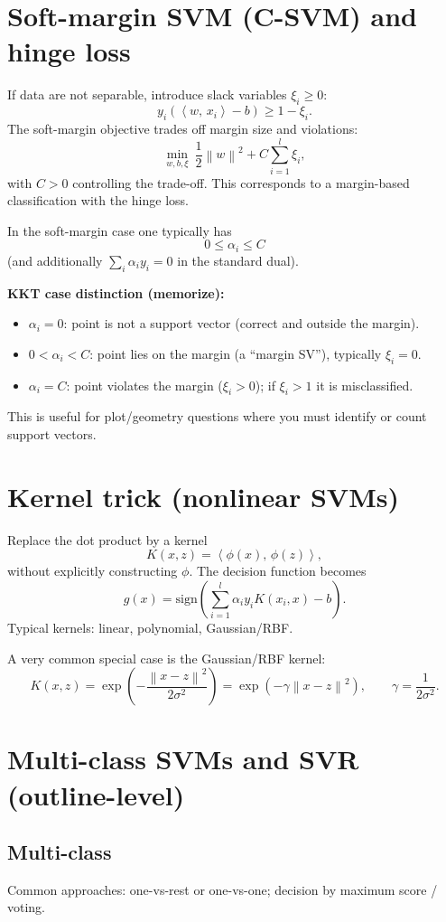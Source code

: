 \documentclass[11pt, oneside]{book}
\newcommand{\norm}[1]{\left\lVert #1 \right\rVert}
\newcommand{\inner}[2]{\left\langle #1,\, #2 \right\rangle}
\newcommand{\1}{\ind}                       %
\newcommand{\ip}[2]{\inner{#1}{#2}}        %
\begin{document}
\section{Soft-margin SVM (C-SVM) and hinge loss}
If data are not separable, introduce slack variables $\xi_i\ge 0$:
\[
  y_i(\ip{w}{x_i}-b)\ge 1-\xi_i.
\]
The soft-margin objective trades off margin size and violations:
\[
  \min_{w,b,\xi}\ \frac12\norm{w}^2 + C\sum_{i=1}^{l}\xi_i,
\]
with $C>0$ controlling the trade-off.
This corresponds to a margin-based classification with the hinge loss.

\begin{notebox}[title={Soft-Margin: Dual Bounds and KKT Cases}]
In the soft-margin case one typically has
\[
0\le \alpha_i \le C
\]
(and additionally $\sum_i \alpha_i y_i=0$ in the standard dual).

\textbf{KKT case distinction (memorize):}
\begin{itemize}
  \item $\alpha_i=0$: point is not a support vector (correct and outside the margin).
  \item $0<\alpha_i<C$: point lies on the margin (a ``margin SV''), typically $\xi_i=0$.
  \item $\alpha_i=C$: point violates the margin ($\xi_i>0$); if $\xi_i>1$ it is misclassified.
\end{itemize}
This is useful for plot/geometry questions where you must identify or count support vectors.
\end{notebox}

\section{Kernel trick (nonlinear SVMs)}
Replace the dot product by a kernel
\[
K(x,z)=\ip{\phi(x)}{\phi(z)},
\]
without explicitly constructing $\phi$.
The decision function becomes
\[
  g(x)=\mathrm{sign}\left(\sum_{i=1}^{l}\alpha_i y_i K(x_i,x)-b\right).
\]
Typical kernels: linear, polynomial, Gaussian/RBF.

A very common special case is the Gaussian/RBF kernel:
\[
K(x,z)=\exp\!\left(-\frac{\norm{x-z}^2}{2\sigma^2}\right)
=\exp\!\left(-\gamma\norm{x-z}^2\right),\qquad \gamma=\frac{1}{2\sigma^2}.
\]

\section{Multi-class SVMs and SVR (outline-level)}
\subsection{Multi-class}
Common approaches: one-vs-rest or one-vs-one; decision by maximum score / voting.
\end{document}
